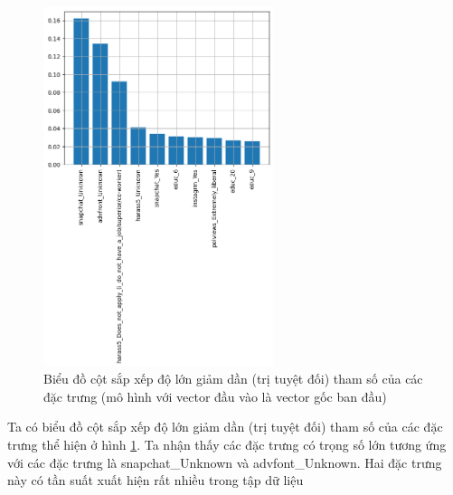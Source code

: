 \begin{enumerate}[label=(\alph*)]
    \begin{figure}[H]
        \centering
        \includegraphics[width=0.6\textwidth]{figures/Thanh/Models/XGBoost/With_null_models_Feature_Importance_XGBoost_original_features.png}
        \caption{Biểu đồ cột sắp xếp độ lớn giảm dần (trị tuyệt đối) tham số của các đặc trưng (mô hình với vector đầu vào là vector gốc ban đầu)}
        \label{fig:With_null_models_Feature_Importance_XGBoost_original_features}
    \end{figure}
    
    Ta có biểu đồ cột sắp xếp độ lớn giảm dần (trị tuyệt đối) tham số của các đặc trưng thể hiện ở hình \ref{fig:With_null_models_Feature_Importance_XGBoost_original_features}.
    Ta nhận thấy các đặc trưng có trọng số lớn tương ứng với các đặc trưng là snapchat\_Unknown và advfont\_Unknown.
    Hai đặc trưng này có tần suất xuất hiện rất nhiều trong tập dữ liệu
\end{enumerate}